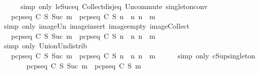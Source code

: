 \begin{isabellebody}
\ \ \ \ \isamarkupfalse%
\ {\isacharparenleft}simp\ only{\isacharcolon}\ le{\isacharunderscore}Suc{\isacharunderscore}eq\ Collect{\isacharunderscore}disj{\isacharunderscore}eq\ Un{\isacharunderscore}commute\ singleton{\isacharunderscore}conv{\isacharparenright}\isanewline
\ \ \isamarkupfalse%
\ \isamarkupfalse%
\ {\isachardoublequoteopen}{\isasymdots}\ {\isacharequal}\ {\isasymUnion}{\isacharparenleft}{\isacharbraceleft}pcp{\isacharunderscore}seq\ C\ S\ {\isacharparenleft}Suc\ m{\isacharparenright}{\isacharbraceright}\ {\isasymunion}\ {\isacharbraceleft}pcp{\isacharunderscore}seq\ C\ S\ n\ {\isacharbar}\ n{\isachardot}\ n\ {\isasymle}\ m{\isacharbraceright}{\isacharparenright}{\isachardoublequoteclose}\isanewline
\ \ \ \ \isamarkupfalse%
\ {\isacharparenleft}simp\ only{\isacharcolon}\ image{\isacharunderscore}Un\ image{\isacharunderscore}insert\ image{\isacharunderscore}empty\ image{\isacharunderscore}Collect{\isacharparenright}\isanewline
\ \ \isamarkupfalse%
\ \isamarkupfalse%
\ {\isachardoublequoteopen}{\isasymdots}\ {\isacharequal}\ {\isasymUnion}{\isacharbraceleft}pcp{\isacharunderscore}seq\ C\ S\ {\isacharparenleft}Suc\ m{\isacharparenright}{\isacharbraceright}\ {\isasymunion}\ {\isasymUnion}{\isacharbraceleft}pcp{\isacharunderscore}seq\ C\ S\ n\ {\isacharbar}\ n{\isachardot}\ n\ {\isasymle}\ m{\isacharbraceright}{\isachardoublequoteclose}\isanewline
\ \ \ \ \isamarkupfalse%
\ {\isacharparenleft}simp\ only{\isacharcolon}\ Union{\isacharunderscore}Un{\isacharunderscore}distrib{\isacharparenright}\isanewline
\ \ \isamarkupfalse%
\ \isamarkupfalse%
\ {\isachardoublequoteopen}{\isasymdots}\ {\isacharequal}\ {\isacharparenleft}pcp{\isacharunderscore}seq\ C\ S\ {\isacharparenleft}Suc\ m{\isacharparenright}{\isacharparenright}\ {\isasymunion}\ {\isasymUnion}{\isacharbraceleft}pcp{\isacharunderscore}seq\ C\ S\ n\ {\isacharbar}\ n{\isachardot}\ n\ {\isasymle}\ m{\isacharbraceright}{\isachardoublequoteclose}\isanewline
\ \ \ \ \isamarkupfalse%
\ {\isacharparenleft}simp\ only{\isacharcolon}\ cSup{\isacharunderscore}singleton{\isacharparenright}\isanewline
\ \ \isamarkupfalse%
\ \isamarkupfalse%
\ {\isachardoublequoteopen}{\isasymdots}\ {\isacharequal}\ {\isacharparenleft}pcp{\isacharunderscore}seq\ C\ S\ {\isacharparenleft}Suc\ m{\isacharparenright}{\isacharparenright}\ {\isasymunion}\ {\isacharparenleft}pcp{\isacharunderscore}seq\ C\ S\ m{\isacharparenright}{\isachardoublequoteclose}\isanewline

\end{isabellebody}
